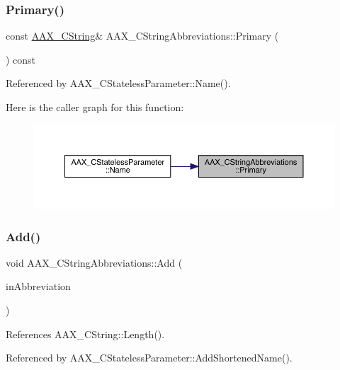 \subsubsection{\texorpdfstring{Primary()}{Primary()}}
{\footnotesize\ttfamily const \mbox{\hyperlink{a01573}{A\+A\+X\+\_\+\+C\+String}}\& A\+A\+X\+\_\+\+C\+String\+Abbreviations\+::\+Primary (\begin{DoxyParamCaption}{ }\end{DoxyParamCaption}) const\hspace{0.3cm}{\ttfamily [inline]}}



Referenced by A\+A\+X\+\_\+\+C\+Stateless\+Parameter\+::\+Name().

Here is the caller graph for this function\+:
\nopagebreak
\begin{figure}[H]
\begin{center}
\leavevmode
\includegraphics[width=350pt]{a01577_acff0707d73249820d7863da3633b1bf9_icgraph}
\end{center}
\end{figure}
\mbox{\label{a01577_a840d1e71735c21a38136812a01693f91}} 
\subsubsection{\texorpdfstring{Add()}{Add()}}
{\footnotesize\ttfamily void A\+A\+X\+\_\+\+C\+String\+Abbreviations\+::\+Add (\begin{DoxyParamCaption}\item[{const \mbox{\hyperlink{a01573}{A\+A\+X\+\_\+\+C\+String}} \&}]{in\+Abbreviation }\end{DoxyParamCaption})\hspace{0.3cm}{\ttfamily [inline]}}



References A\+A\+X\+\_\+\+C\+String\+::\+Length().



Referenced by A\+A\+X\+\_\+\+C\+Stateless\+Parameter\+::\+Add\+Shortened\+Name().

